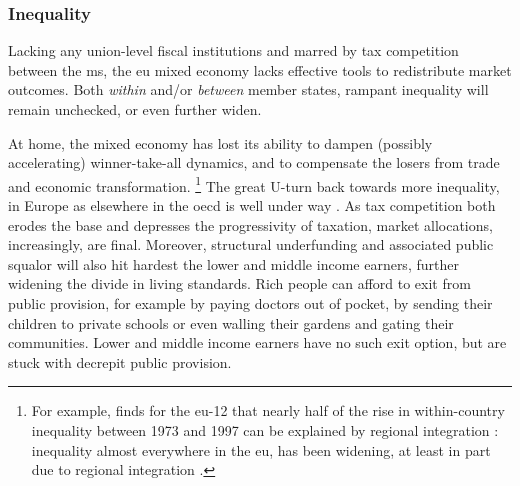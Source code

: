 
\subsubsection{Inequality}
Lacking any union-level fiscal institutions and marred by tax competition between the \gls{ms}, the \gls{eu} mixed economy lacks effective tools to redistribute market outcomes.
Both \emph{within} and/or \emph{between} member states, rampant inequality will remain unchecked, or even further widen.

At home, the mixed economy has lost its ability to dampen (possibly accelerating) winner-take-all dynamics, and to compensate the losers from trade and economic transformation.
\footnote{
	For example, \citeauthor{Beckfield2006} finds for the \gls{eu}-12 that nearly half of the rise in within-country inequality between 1973 and 1997 can be explained by regional integration \citeyearpar[979]{Beckfield2006}:
	inequality almost everywhere in the \gls{eu}, has been widening, at least in part due to regional integration \citep[for example,][265]{DaudUngl2008}.
}
The great U-turn back towards more inequality, in Europe as elsewhere in the \gls{oecd} is well under way \citep{AldersonNielsen-2002-aa}.
As tax competition both erodes the base and depresses the progressivity of taxation, market allocations, increasingly, are final.
Moreover, structural underfunding and associated public squalor will also hit hardest the lower and middle income earners, further widening the divide in living standards.
Rich people can afford to exit from public provision, for example by paying doctors out of pocket, by sending their children to private schools or even walling their gardens and gating their communities.
Lower and middle income earners have no such exit option, but are stuck with decrepit public provision.

